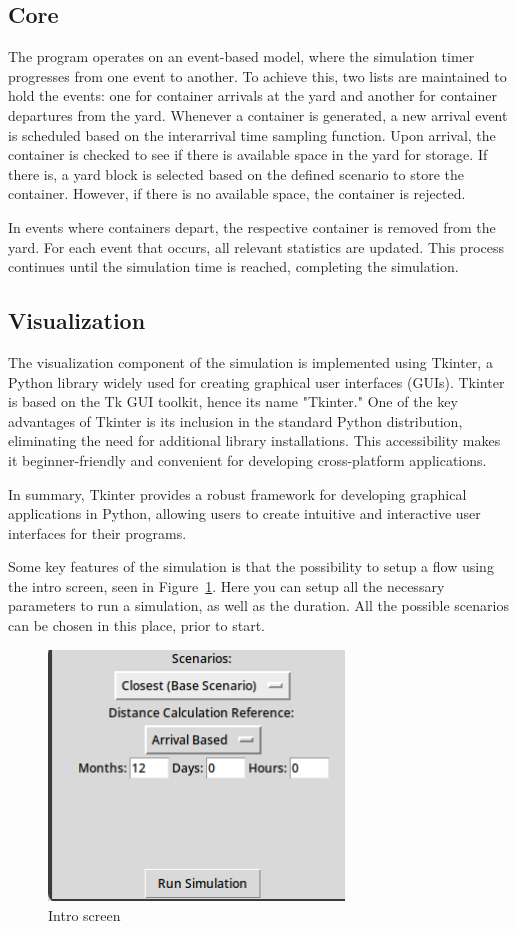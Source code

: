 \documentclass{article}
\begin{document}
\subsection{Core}
The program operates on an event-based model, where the simulation timer
progresses from one event to another. To achieve this, two lists are maintained
to hold the events: one for container arrivals at the yard and another for
container departures from the yard. Whenever a container is generated, a new
arrival event is scheduled based on the interarrival time sampling function.
Upon arrival, the container is checked to see if there is available space in
the yard for storage. If there is, a yard block is selected based on the
defined scenario to store the container. However, if there is no available
space, the container is rejected.

In events where containers depart, the respective container is removed from the
yard. For each event that occurs, all relevant statistics are updated. This
process continues until the simulation time is reached, completing the
simulation.

\subsection{Visualization}
The visualization component of the simulation is implemented using Tkinter, a
Python library widely used for creating graphical user interfaces (GUIs).
Tkinter is based on the Tk GUI toolkit, hence its name "Tkinter." One of the
key advantages of Tkinter is its inclusion in the standard Python distribution,
eliminating the need for additional library installations. This accessibility
makes it beginner-friendly and convenient for developing cross-platform
applications.

In summary, Tkinter provides a robust framework for developing graphical
applications in Python, allowing users to create intuitive and interactive user
interfaces for their programs.

Some key features of the simulation is that the possibility to setup a flow
using the intro screen, seen in Figure~\ref{fig:intro}. Here you can setup all
the necessary parameters to run a simulation, as well as the duration. All the
possible scenarios can be chosen in this place, prior to start.
\begin{figure}
    \centering
    \includegraphics[width=0.7\textwidth]{fig/intro_screen.png}
    \caption{Intro screen}\label{fig:intro}
\end{figure}
\end{document}
